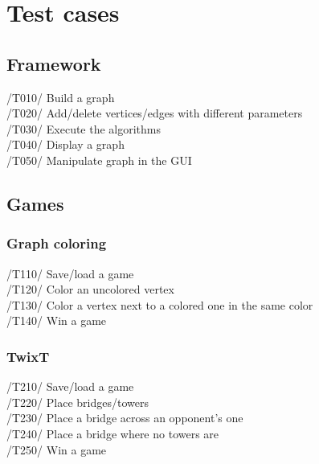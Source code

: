 \section{Test cases}

\subsection{Framework}

/T010/ Build a graph \\

/T020/ Add/delete vertices/edges with different parameters \\

/T030/ Execute the algorithms \\

/T040/ Display a graph \\

/T050/ Manipulate graph in the GUI \\

\subsection{Games}

\subsubsection{Graph coloring}

/T110/ Save/load a game \\

/T120/ Color an uncolored vertex \\

/T130/ Color a vertex next to a colored one in the same color \\

/T140/ Win a game

\subsubsection{TwixT}

/T210/ Save/load a game \\

/T220/ Place bridges/towers \\

/T230/ Place a bridge across an opponent's one \\

/T240/ Place a bridge where no towers are \\

/T250/ Win a game \\


